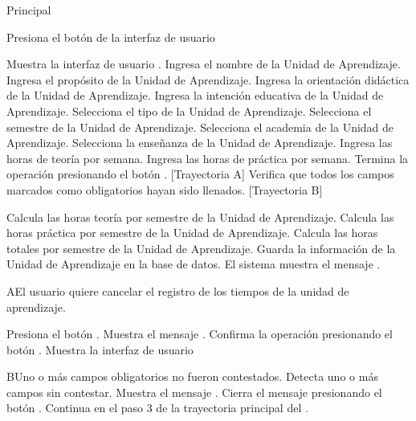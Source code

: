 \begin{UCtrayectoria}{Principal}
    
    \UCpaso[\UCactor] Presiona el botón  de la interfaz de usuario 
    
    \UCpaso Muestra la interfaz de usuario .
    \UCpaso[\UCactor] Ingresa el nombre de la Unidad de Aprendizaje.
    \UCpaso[\UCactor] Ingresa el propósito de la Unidad de Aprendizaje.
    \UCpaso[\UCactor] Ingresa la orientación didáctica de la Unidad de Aprendizaje.
    \UCpaso[\UCactor] Ingresa la intención educativa de la Unidad de Aprendizaje.
    \UCpaso[\UCactor] Selecciona el tipo de la Unidad de Aprendizaje.
    \UCpaso[\UCactor] Selecciona el semestre de la Unidad de Aprendizaje.
    \UCpaso[\UCactor] Selecciona el academia de la Unidad de Aprendizaje.
    \UCpaso[\UCactor] Selecciona la enseñanza de la Unidad de Aprendizaje.
    \UCpaso[\UCactor] Ingresa las horas de teoría por semana.
    \UCpaso[\UCactor] Ingresa las horas de práctica por semana.
    \UCpaso[\UCactor] Termina la operación presionando el botón . [Trayectoria A] 
    \UCpaso Verifica que todos los campos marcados como obligatorios hayan sido llenados. [Trayectoria B]
    
    \UCpaso Calcula las horas teoría por semestre de la Unidad de Aprendizaje.
    \UCpaso Calcula las horas práctica por semestre de la Unidad de Aprendizaje.
    \UCpaso Calcula las horas totales por semestre de la Unidad de Aprendizaje.
    \UCpaso Guarda la información de la Unidad de Aprendizaje en la base de datos.
    \UCpaso El sistema muestra el mensaje .
\end{UCtrayectoria}

\begin{UCtrayectoriaA}{A}{El usuario quiere cancelar el registro de los tiempos de la unidad de aprendizaje.}

    \UCpaso[\UCactor] Presiona el botón .
    \UCpaso Muestra el mensaje .
    \UCpaso[\UCactor] Confirma la operación presionando el botón .
    \UCpaso Muestra la interfaz de usuario 
    
\end{UCtrayectoriaA}


\begin{UCtrayectoriaA}{B}{Uno o más campos obligatorios no fueron contestados.}
	\UCpaso Detecta uno o más campos sin contestar.
    \UCpaso Muestra el mensaje .
    \UCpaso[\UCactor] Cierra el mensaje presionando el botón .
    \UCpaso Continua en el paso 3 de la trayectoria principal del .
\end{UCtrayectoriaA}